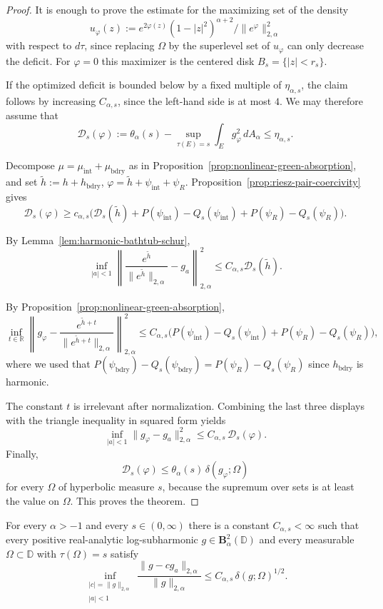 \documentclass[a4paper,10pt]{amsart}
\newcommand{\D}{\mathbb{D}}
\begin{document}
\begin{proof}
It is enough to prove the estimate for the maximizing set of the density
\[
u_\varphi(z):=
e^{2\varphi(z)}(1-|z|^2)^{\alpha+2}
\Big/\|e^\varphi\|_{2,\alpha}^2
\]
with respect to $d\tau$, since replacing $\Omega$ by the superlevel set of
$u_\varphi$ can only decrease the deficit. For $\varphi=0$ this maximizer is
the centered disk $B_s=\{|z|<r_s\}$.

If the optimized deficit is bounded below by a fixed multiple of
$\eta_{\alpha,s}$, the claim follows by increasing $C_{\alpha,s}$, since the
left-hand side is at most $4$. We may therefore assume that
\[
\mathcal D_s(\varphi)
:=
\theta_\alpha(s)
-
\sup_{\tau(E)=s}\int_E g_\varphi^2\,dA_\alpha
\le\eta_{\alpha,s}.
\]

Decompose $\mu=\mu_{\mathrm{int}}+\mu_{\mathrm{bdry}}$ as in
Proposition~\ref{prop:nonlinear-green-absorption}, and set
$\widetilde h:=h+h_{\mathrm{bdry}}$,
$\varphi=\widetilde h+\psi_{\mathrm{int}}+\psi_R$.
Proposition~\ref{prop:riesz-pair-coercivity} gives
\[
\mathcal D_s(\varphi)
\ge
c_{\alpha,s}\bigl(\mathcal D_s(\widetilde h)
+P(\psi_{\mathrm{int}})-Q_s(\psi_{\mathrm{int}})
+P(\psi_R)-Q_s(\psi_R)\bigr).
\]

By Lemma~\ref{lem:harmonic-bathtub-schur},
\[
\inf_{|a|<1}
\left\|
\frac{e^{\widetilde h}}{\|e^{\widetilde h}\|_{2,\alpha}}-g_a
\right\|_{2,\alpha}^2
\le
C_{\alpha,s}\mathcal D_s(\widetilde h).
\]

By Proposition~\ref{prop:nonlinear-green-absorption},
\[
\inf_{t\in\mathbb R}
\left\|
g_\varphi-
\frac{e^{\widetilde h+t}}{\|e^{\widetilde h+t}\|_{2,\alpha}}
\right\|_{2,\alpha}^2
\le
C_{\alpha,s}\bigl(P(\psi_{\mathrm{int}})-Q_s(\psi_{\mathrm{int}})
+P(\psi_R)-Q_s(\psi_R)\bigr),
\]
where we used that $P(\psi_{\mathrm{bdry}})-Q_s(\psi_{\mathrm{bdry}})
=P(\psi_R)-Q_s(\psi_R)$ since $h_{\mathrm{bdry}}$ is harmonic.

The constant $t$ is irrelevant after normalization. Combining the last three
displays with the triangle inequality in squared form yields
\[
\inf_{|a|<1}\|g_\varphi-g_a\|_{2,\alpha}^2
\le
C_{\alpha,s}\,\mathcal D_s(\varphi).
\]
Finally,
\[
\mathcal D_s(\varphi)
\le
\theta_\alpha(s)\,\delta(g_\varphi;\Omega)
\]
for every $\Omega$ of hyperbolic measure $s$, because the supremum over sets is
at least the value on $\Omega$. This proves the theorem.
\end{proof}


\begin{numthm}\label{thm:global-half-from-green-absorption}
For every $\alpha>-1$ and every $s\in(0,\infty)$ there is a constant
$C_{\alpha,s}<\infty$ such that every positive real-analytic log-subharmonic
$g\in\mathbf B_\alpha^2(\D)$ and every measurable
$\Omega\subset\D$ with $\tau(\Omega)=s$ satisfy
\[
\inf_{\substack{|c|=\|g\|_{2,\alpha}\\ |a|<1}}
\frac{\|g-cg_a\|_{2,\alpha}}{\|g\|_{2,\alpha}}
\le
C_{\alpha,s}\,\delta(g;\Omega)^{1/2}.
\]
\end{numthm}
\end{document}
